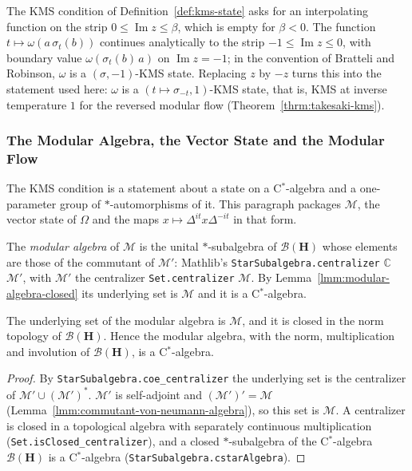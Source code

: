 The KMS condition of Definition~\ref{def:kms-state} asks for an interpolating function on the strip $0 \le \operatorname{Im} z \le \beta$, which is empty for $\beta < 0$. The function $t \mapsto \omega(a\,\sigma_t(b))$ continues analytically to the strip $-1 \le \operatorname{Im} z \le 0$, with boundary value $\omega(\sigma_t(b)\,a)$ on $\operatorname{Im} z = -1$; in the convention of Bratteli and Robinson, $\omega$ is a $(\sigma, -1)$-KMS state. Replacing $z$ by $-z$ turns this into the statement used here: $\omega$ is a $(t \mapsto \sigma_{-t}, 1)$-KMS state, that is, KMS at inverse temperature $1$ for the reversed modular flow (Theorem~\ref{thrm:takesaki-kms}).

\subsubsection{The Modular Algebra, the Vector State and the Modular Flow}

The KMS condition is a statement about a state on a C$^*$-algebra and a one-parameter group of $*$-automorphisms of it. This paragraph packages $\mathcal{M}$, the vector state of $\Omega$ and the maps $x \mapsto \Delta^{it}x\Delta^{-it}$ in that form.

\begin{definition}
    \label{def:modular-algebra}
    \leanok
    The \emph{modular algebra} of $\mathcal{M}$ is the unital $*$-subalgebra of $\mathcal{B}(\mathbf{H})$ whose elements are those of the commutant of $\mathcal{M}'$: Mathlib's \texttt{StarSubalgebra.centralizer} $\mathbb{C}$ $\mathcal{M}'$, with $\mathcal{M}'$ the centralizer \texttt{Set.centralizer} $\mathcal{M}$. By Lemma~\ref{lmm:modular-algebra-closed} its underlying set is $\mathcal{M}$ and it is a C$^*$-algebra.
\end{definition}

\begin{lemma}
    \label{lmm:modular-algebra-closed}
    \leanok
    The underlying set of the modular algebra is $\mathcal{M}$, and it is closed in the norm topology of $\mathcal{B}(\mathbf{H})$. Hence the modular algebra, with the norm, multiplication and involution of $\mathcal{B}(\mathbf{H})$, is a C$^*$-algebra.
\end{lemma}
\begin{proof}
    \leanok
    By \texttt{StarSubalgebra.coe\_centralizer} the underlying set is the centralizer of $\mathcal{M}' \cup (\mathcal{M}')^*$. $\mathcal{M}'$ is self-adjoint and $(\mathcal{M}')' = \mathcal{M}$ (Lemma~\ref{lmm:commutant-von-neumann-algebra}), so this set is $\mathcal{M}$. A centralizer is closed in a topological algebra with separately continuous multiplication (\texttt{Set.isClosed\_centralizer}), and a closed $*$-subalgebra of the C$^*$-algebra $\mathcal{B}(\mathbf{H})$ is a C$^*$-algebra (\texttt{StarSubalgebra.cstarAlgebra}).
\end{proof}


